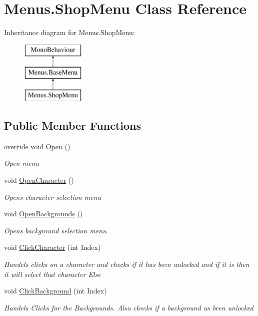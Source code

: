 \hypertarget{class_menus_1_1_shop_menu}{}\section{Menus.\+Shop\+Menu Class Reference}
\label{class_menus_1_1_shop_menu}
Inheritance diagram for Menus.\+Shop\+Menu\+:\begin{figure}[H]
\begin{center}
\leavevmode
\includegraphics[height=3.000000cm]{class_menus_1_1_shop_menu}
\end{center}
\end{figure}
\subsection*{Public Member Functions}
\begin{DoxyCompactItemize}
\item 
override void \hyperlink{class_menus_1_1_shop_menu_af79b153c30d06137091f0b021d2c626b}{Open} ()
\begin{DoxyCompactList}\small\item\em Open menu \end{DoxyCompactList}\item 
void \hyperlink{class_menus_1_1_shop_menu_a73ccd36ee27ff79f736fc7aa563d1cc1}{Open\+Character} ()
\begin{DoxyCompactList}\small\item\em Opens character selection menu \end{DoxyCompactList}\item 
void \hyperlink{class_menus_1_1_shop_menu_a903ec61aa167d426010e4632ec9e3f59}{Open\+Backgrounds} ()
\begin{DoxyCompactList}\small\item\em Opens background selection menu \end{DoxyCompactList}\item 
void \hyperlink{class_menus_1_1_shop_menu_a403a38bf336dacd0d5f412ba0aaf4520}{Click\+Character} (int Index)
\begin{DoxyCompactList}\small\item\em Handels clicks on a character and checks if it has been unlocked and if it is then it will select that character Else \end{DoxyCompactList}\item 
void \hyperlink{class_menus_1_1_shop_menu_a8aa4cb8db5ba4c53087af77e39232cf6}{Click\+Background} (int Index)
\begin{DoxyCompactList}\small\item\em Handels Clicks for the Backgrounds. Also checks if a background as been unlocked \end{DoxyCompactList}\end{DoxyCompactItemize}
